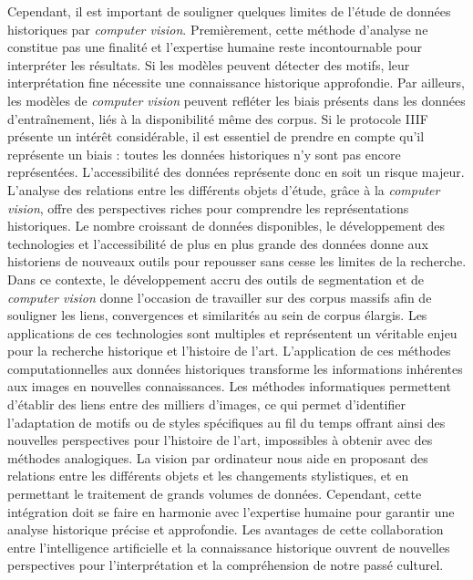 \documentclass[12pt,twoside]{book}
\begin{document}
Cependant, il est important de souligner quelques limites de l’étude de données historiques par \textit{computer vision}. Premièrement, cette méthode d’analyse ne constitue pas une finalité et l'expertise humaine reste incontournable pour interpréter les résultats. Si les modèles peuvent détecter des motifs, leur interprétation fine nécessite une connaissance historique approfondie. Par ailleurs, les modèles de \textit{computer vision} peuvent refléter les biais présents dans les données d'entraînement, liés à la disponibilité même des corpus. Si le protocole IIIF présente un intérêt considérable, il est essentiel de prendre en compte qu’il représente un biais : toutes les données historiques n’y sont pas encore représentées. L’accessibilité des données représente donc en soit un risque majeur. \\

L’analyse des relations entre les différents objets d’étude, grâce à la \textit{computer vision}, offre des perspectives riches pour comprendre les représentations historiques. Le nombre croissant de données disponibles, le développement des technologies et l'accessibilité de plus en plus grande des données donne aux historiens de nouveaux outils pour repousser sans cesse les limites de la recherche. Dans ce contexte, le développement accru des outils de segmentation et de \textit{computer vision} donne l'occasion de travailler sur des corpus massifs afin de souligner les liens, convergences et similarités au sein de corpus élargis. Les applications de ces technologies sont multiples et représentent un véritable enjeu pour la recherche historique et l'histoire de l'art. L'application de ces méthodes computationnelles aux données historiques transforme les informations inhérentes aux images en nouvelles connaissances. Les méthodes informatiques permettent d’établir des liens entre des milliers d'images, ce qui permet d'identifier l'adaptation de motifs ou de styles spécifiques au fil du temps offrant ainsi des nouvelles perspectives pour l'histoire de l'art, impossibles à obtenir avec des méthodes analogiques. La vision par ordinateur nous aide en proposant des relations entre les différents objets et les changements stylistiques, et en permettant le traitement de grands volumes de données. Cependant, cette intégration doit se faire en harmonie avec l'expertise humaine pour garantir une analyse historique précise et approfondie. Les avantages de cette collaboration entre l'intelligence artificielle et la connaissance historique ouvrent de nouvelles perspectives pour l'interprétation et la compréhension de notre passé culturel.
\end{document}
